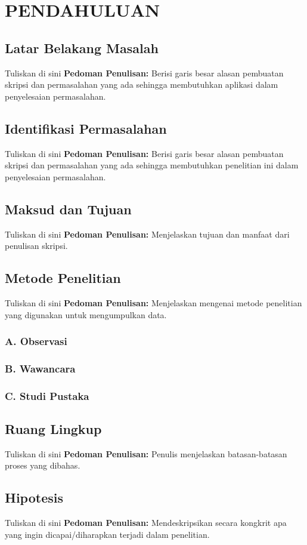 \chapter{PENDAHULUAN}
\section{Latar Belakang Masalah}


Tuliskan di sini \textbf{Pedoman Penulisan:} Berisi garis besar alasan pembuatan skripsi dan permasalahan yang ada sehingga membutuhkan aplikasi dalam penyelesaian permasalahan.


\section{Identifikasi Permasalahan}


Tuliskan di sini \textbf{Pedoman Penulisan:} Berisi garis besar alasan pembuatan skripsi dan permasalahan yang ada sehingga membutuhkan penelitian ini dalam penyelesaian permasalahan.


\section{Maksud dan Tujuan}


Tuliskan di sini \textbf{Pedoman Penulisan:} Menjelaskan tujuan dan manfaat dari penulisan skripsi.


\section{Metode Penelitian}


Tuliskan di sini \textbf{Pedoman Penulisan:} Menjelaskan mengenai metode penelitian yang digunakan untuk mengumpulkan data.


\subsection*{A. Observasi}
\subsection*{B. Wawancara}
\subsection*{C. Studi Pustaka}
\section{Ruang Lingkup}


Tuliskan di sini \textbf{Pedoman Penulisan:} Penulis menjelaskan batasan-batasan proses yang dibahas.


\section{Hipotesis}


Tuliskan di sini \textbf{Pedoman Penulisan:} Mendeskripsikan secara kongkrit apa yang ingin dicapai/diharapkan terjadi dalam penelitian.


